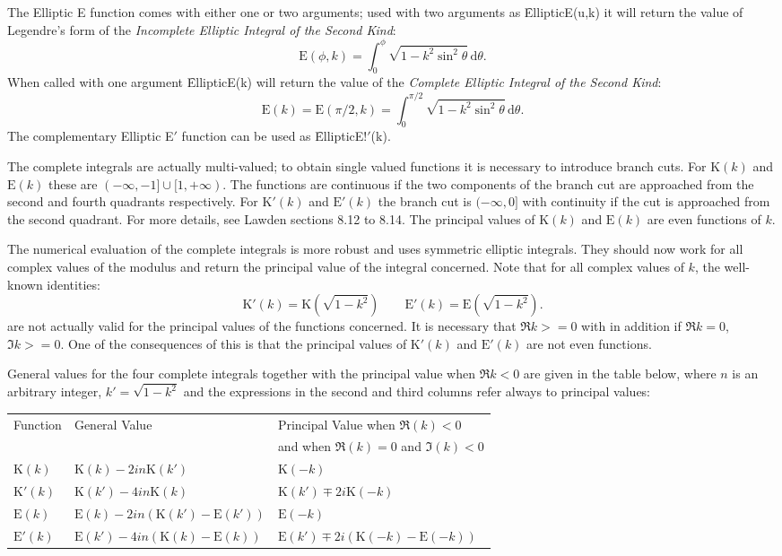 The Elliptic E function comes with either one or two arguments;
used with two arguments as \f{EllipticE(u,k)}
it will return the value of Legendre's form of
the \emph{Incomplete Elliptic Integral of the Second Kind}:
\[\mathrm{E}(\phi, k)=\int_0^\phi \sqrt{1-k^2 \sin^2 \theta} \,\mathrm{d}\theta.\]
 When called with one argument \f{EllipticE(k)} will return the value of the
\emph{Complete Elliptic Integral of the Second Kind}:
\[\mathrm{E}(k)=\mathrm{E}(\pi/2, k) =
\int_0^{\pi/2} \sqrt{1-k^2 \sin^2 \theta} \,\mathrm{d}\theta.\]
The complementary Elliptic E$'$ function can be used as \f{EllipticE!$'$(k)}.

The complete integrals are actually multi-valued; to obtain single valued
functions it is necessary to introduce branch cuts. For $\mathrm{K}(k)$ and
$\mathrm{E}(k)$  these are $(-\infty, -1] \cup [1, +\infty)$.
The functions are continuous if the two components of the branch cut are
approached from the second and fourth quadrants respectively.
For $\mathrm{K}'(k)$ and $\mathrm{E}'(k)$ the branch cut is
$(-\infty, 0]$ with continuity if the cut is approached from the second
quadrant. For more details, see Lawden \cite{Lawden:89} sections 8.12 to 8.14.
The principal values of $\mathrm{K}(k)$ and $\mathrm{E}(k)$ are even functions
of $k$.

The numerical evaluation of the complete integrals is more robust and
 uses symmetric elliptic integrals. They should now work for all complex
values of the modulus and return the principal value of the integral concerned.
Note that for all complex values of $k$, the well-known identities:
\[\mathrm{K}'(k)=\mathrm{K}(\sqrt{1-k^2})\qquad
\mathrm{E}'(k) = \mathrm{E}(\sqrt{1-k^2}).\]
are not actually valid for the principal values of the functions concerned.
It is necessary that $\Re k >=0$ with in addition if $\Re k=0$, $\Im k>=0$.
One of the consequences of this is that the principal values of
$\mathrm{K}'(k)$ and $\mathrm{E}'(k)$ are not even functions.

General values for the four complete integrals together with the principal value
when $\Re{k} <0$ are given in the table below, where
 $n$ is an arbitrary integer, $k' = \sqrt{1-k^2}$ and the expressions
in the second and third columns refer always to principal values:

\begin{tabular}  {lll}
  Function&General Value&Principal Value when $\Re(k) <0$\\
  &&and when $\Re(k)=0$ and $\Im(k) <0$\\
$\mathrm{K}(k)$& $\mathrm{K}(k)-2in\mathrm{K}(k')$&$\mathrm{K}(-k)$\\
$\mathrm{K}'(k)$& $\mathrm{K}(k')-4in\mathrm{K}(k)$&$\mathrm{K}(k')\mp 2i\mathrm{K}(-k)$\\
$\mathrm{E}(k)$& $\mathrm{E}(k)-2in(\mathrm{K}(k')-\mathrm{E}(k'))$&$\mathrm{E}(-k)$\\
  $\mathrm{E}'(k)$& $\mathrm{E}(k')-4in(\mathrm{K}(k)-\mathrm{E}(k))$&
  $\mathrm{E}(k')\mp 2i(\mathrm{K}(-k)-\mathrm{E}(-k))$\\
\end{tabular}

